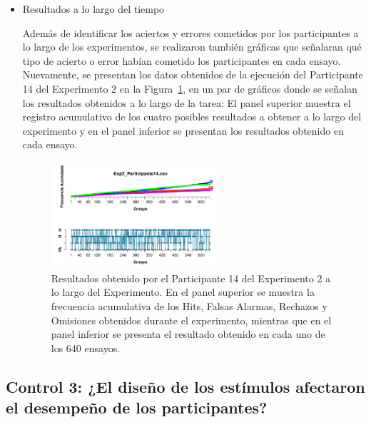 \begin{itemize}
\item Resultados a lo largo del tiempo

Además de identificar los aciertos y errores cometidos por los participantes a lo largo de los experimentos, se realizaron también gráficas que señalaran qué tipo de acierto o error habían cometido los participantes en cada ensayo. Nuevamente, se presentan los datos obtenidos de la ejecución del Participante 14 del Experimento 2 en la Figura~\ref{fig:Outcome_E2_P14}, en un par de gráficos donde se señalan los resultados obtenidos a lo largo de la tarea: El panel superior muestra el registro acumulativo de los cuatro posibles resultados a obtener a lo largo del experimento y en el panel inferior se presentan los resultados obtenido en cada ensayo.\\ 

\begin{figure}[th]
\centering
\includegraphics[width=0.60\textwidth]{Figures/Outcome_Exp2_P14}
\caption[Resultado obtenido a lo largo del tiempo: Ejemplo]{Resultados obtenido por el Participante 14 del Experimento 2 a lo largo del Experimento. En el panel superior se muestra la frecuencia acumulativa de los  Hits, Falsas Alarmas, Rechazos y Omisiones obtenidos durante el experimento, mientras que en el panel inferior se presenta el resultado obtenido en cada uno de los 640 ensayos.}
\label{fig:Outcome_E2_P14}
\end{figure}


\end{itemize}










\subsection{Control 3: ¿El diseño de los estímulos afectaron el desempeño de los participantes?}

